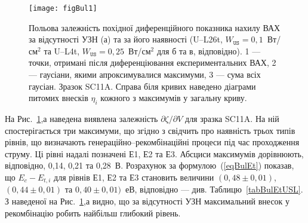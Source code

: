 \begin{figure}
\center
\texttt{[image: figBul1]}
\caption{\label{figBul1}
Польова залежність похідної диференційного показника нахилу ВАХ за відсутності УЗН (а)
та за його наявності (U--L26t, $W_\mathtt{US}=0,1$~Вт/см$^2$ та U--L4t,  $W_\mathtt{US}=0,25$~Вт/см$^2$ для б та в, відповідно).
1 --- точки, отримані після диференціювання експериментальних ВАХ,
2 --- гаусіани, якими апроксимувалися максимуми,
3 --- сума всіх гаусіан.
Зразок SC11A.
Справа біля кривих наведено діаграми питомих внесків $\eta_i$ кожного з максимумів у загальну криву.
}%
\end{figure}

На Рис.~\ref{figBul1},а наведена виявлена залежність $\partial \zeta/ \partial V $ для зразка SC11A.
На ній спостерігається три максимуми, що згідно з \cite{Bulyar} свідчить про наявність
трьох типів рівнів, що визначають генераційно--рекомбінаційні процеси під час проходження струму.
Ці рівні надалі позначені Е1, Е2 та Е3.
Абсциси максимумів дорівнюють, відповідно, 0,14, 0,21 та 0,28~В.
Розрахунок за формулою~(\ref{eqBulEt}) показав,
що  $E_c-E_{t,i}$ для рівнів  Е1, Е2 та Е3 становить величини $(0,48\pm0,01)$, $(0,44\pm0,01)$ та $0,40\pm0,01)$~еВ, відповідно --- див. Таблицю~\ref{tabBulEtUSL}.
З наведеної на Рис.~\ref{figBul1},а видно, що за відсутності УЗН максимальний внесок у рекомбінацію робить найбільш глибокий рівень.





